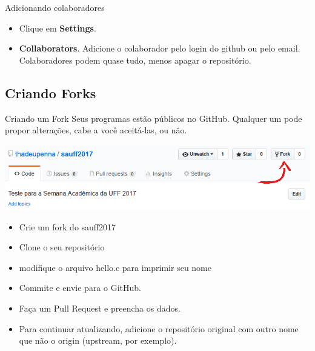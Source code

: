 \begin{frame}{Adicionando colaboradores}
	
	\begin{itemize}
		\item Clique em \textbf{Settings}. 
		\item \textbf{Collaborators}. Adicione o colaborador pelo login do github ou pelo email. Colaboradores podem quase tudo, menos apagar o repositório. 
	\end{itemize}

\end{frame}

\subsection{Criando Forks}
\begin{frame}{Criando um Fork}
Seus programas estão públicos no GitHub. Qualquer um pode propor alterações, cabe a você aceitá-las, ou não.
\begin{center}
	\includegraphics[width=\textwidth]{figures/fork}
\end{center}
\begin{itemize}
	\item Crie um fork do sauff2017
	\item Clone o seu repositório
	\item modifique o arquivo hello.c para imprimir seu nome
	\item Commite e envie para o GitHub.
	\item Faça um Pull Request e preencha os dados.
	\item Para continuar atualizando, adicione o repositório original com outro nome que não o origin (upstream, por exemplo).
\end{itemize}
\end{frame}


%
%
%
%
%

